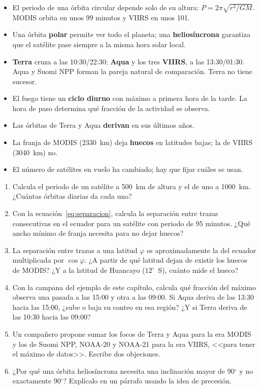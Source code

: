 \resumen

\begin{itemize}
  \item El periodo de una órbita circular depende solo de su altura:
  $P = 2\pi\sqrt{r^3/GM}$. MODIS orbita en unos 99 minutos y VIIRS en unos 101.
  \item Una órbita \textbf{polar} permite ver todo el planeta; una \textbf{heliosíncrona}
  garantiza que el satélite pase siempre a la misma hora solar local.
  \item \textbf{Terra} cruza a las 10:30/22:30; \textbf{Aqua} y los tres \textbf{VIIRS}, a las
  13:30/01:30. Aqua y Suomi NPP forman la pareja natural de comparación. Terra no tiene sucesor.
  \item El fuego tiene un \textbf{ciclo diurno} con máximo a primera hora de la tarde. La hora
  de paso determina qué fracción de la actividad se observa.
  \item Las órbitas de Terra y Aqua \textbf{derivan} en sus últimos años.
  \item La franja de MODIS (2330~km) deja \textbf{huecos} en latitudes bajas; la de VIIRS
  (3040~km) no.
  \item El número de satélites en vuelo ha cambiado; hay que fijar cuáles se usan.
\end{itemize}

\ejercicios

\begin{enumerate}
  \item Calcula el periodo de un satélite a 500~km de altura y el de uno a 1000~km. ¿Cuántas
  órbitas diarias da cada uno?
  \item Con la ecuación~\eqref{eq:separacion}, calcula la separación entre trazas consecutivas
  en el ecuador para un satélite con periodo de 95 minutos. ¿Qué ancho mínimo de franja necesita
  para no dejar huecos?
  \item La separación entre trazas a una latitud $\varphi$ es aproximadamente la del ecuador
  multiplicada por $\cos\varphi$. ¿A partir de qué latitud dejan de existir los huecos de
  MODIS? ¿Y a la latitud de Huancayo ($12^\circ$~S), cuánto mide el hueco?
  \item Con la campana del ejemplo de este capítulo, calcula qué fracción del máximo observa una
  pasada a las 15:00 y otra a las 09:00. Si Aqua deriva de las 13:30 hacia las 15:00, ¿sube o
  baja su conteo en esa región? ¿Y si Terra deriva de las 10:30 hacia las 09:00?
  \item Un compañero propone sumar los focos de Terra y Aqua para la era MODIS y los de Suomi
  NPP, NOAA-20 y NOAA-21 para la era VIIRS, <<para tener el máximo de datos>>. Escribe dos
  objeciones.
  \item ¿Por qué una órbita heliosíncrona necesita una inclinación mayor de 90$^\circ$ y no
  exactamente 90$^\circ$? Explícalo en un párrafo usando la idea de precesión.
\end{enumerate}
